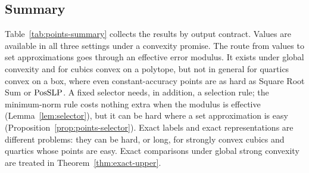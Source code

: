 \subsection{Summary}\label{sec:points-summary}

Table~\ref{tab:points-summary} collects the results by output contract.
Values are available in all three settings under a convexity promise. The
route from values to set approximations goes through an effective error
modulus. It exists under global convexity and for cubics convex on a
polytope, but not in general for quartics convex on a box, where even
constant-accuracy points are as hard as Square Root Sum or $\mathrm{PosSLP}$. A
fixed selector needs, in addition, a selection rule; the minimum-norm rule
costs nothing extra when the modulus is effective
(Lemma~\ref{lem:selector}), but it can be hard where a set approximation is
easy (Proposition~\ref{prop:points-selector}). Exact labels and exact
representations are different problems: they can be hard, or long, for
strongly convex cubics and quartics whose points are easy. Exact comparisons
under global strong convexity are treated in Theorem~\ref{thm:exact-upper}.

